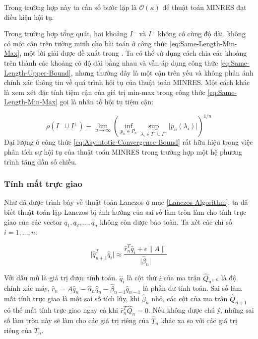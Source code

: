 \documentclass[14pt, a4paper]{article}
\numberwithin{equation}{section}
\numberwithin{algorithm}{section}
\numberwithin{figure}{section}
\numberwithin{dl}{section}
\numberwithin{md}{section}
\numberwithin{bd}{section}
\numberwithin{dn}{section}
\begin{document}
\begin{enumerate}[a)]
\begin{itemize}
        Trong trường hợp này ta cần số bước lặp là $\mathcal{O}(\kappa)$ để thuật toán MINRES đạt điều kiện hội tụ.

        Trong trường hợp tổng quát, hai khoảng $I^-$ và $I^+$ không có cùng độ dài, không có một cận trên tường minh cho bài toán ở công thức \ref{eq:Same-Length-Min-Max}, một lời giải được đề xuất trong \cite{fischer2011polynomial}. Ta có thể sử dụng cách chia các khoảng trên thành các khoảng có độ dài bằng nhau và vẫn áp dụng công thức \ref{eq:Same-Length-Upper-Bound}, nhưng thường đây là một cận trên yếu và không phản ánh chính xác thông tin về quá trình hội tụ của thuật toán MINRES.
        Một cách khác là xem xét đặc tính tiệm cận của giá trị min-max trong công thức \ref{eq:Same-Length-Min-Max} gọi là nhân tố hội tụ tiệm cận:

        \begin{equation} \label{eq:Asymtotic-Convergence-Bound}
            \rho(I^- \cup I^+) \equiv \lim_{n \rightarrow \infty} (\inf_{p_n \in P_n} \sup_{\lambda_i \in I^- \cup I^+} \lvert p_n(\lambda_i) \rvert)^{1/n}
        \end{equation}
        Đại lượng ở công thức \ref{eq:Asymtotic-Convergence-Bound} rất hữu hiệu trong việc phân tích sự hội tụ của thuật toán MINRES trong trường hợp một hệ phương trình tăng dần số chiều.

    \end{itemize}
\end{enumerate}

\subsubsection{Tính mất trực giao}

Như đã được trình bày về thuật toán Lanczos ở mục \ref{Lanczos-Algorithm}, ta đã biết thuật toán lặp Lanczos bị ảnh hưởng của sai số làm tròn làm cho tính trực giao của các vector $q_1, q_2, \dots, q_n$ không còn được bảo toàn. Ta xét các chỉ số $i=1, \dots, n$:

\begin{equation}
    \lvert \hat{q}_{n+1}^T \hat{q}_i \rvert \approx \dfrac{\hat{r}_n^T \hat{q}_i + \epsilon \lVert A \rVert}{\lvert \hat{\beta}_n \rvert}
\end{equation}

Với dấu mũ là giá trị được tính toán. $\hat{q}_i$ là cột thứ $i$ của ma trận $\hat{Q}_n$, $\epsilon$ là độ chính xác máy, $\hat{r}_n=A\hat{q}_n - \hat{\alpha}_n \hat{q}_n - \hat{\beta}_{n-1} \hat{q}_{n-1} $ là phần dư tính toán. Sai số làm mất tính trực giao là một sai số tích lũy, khi $\hat{\beta}_n$ nhỏ, các cột của ma trận $\hat{Q}_{n+1}$ có thể mất tính trực giao ngay cả khi $\hat{r}_n^T \hat{Q}_n=0$. Nếu không được chú ý, những sai số làm tròn này sẽ làm cho các giá trị riêng của $\hat{T}_n$ khác xa so với các giá trị riêng của $T_n$.
\end{document}
